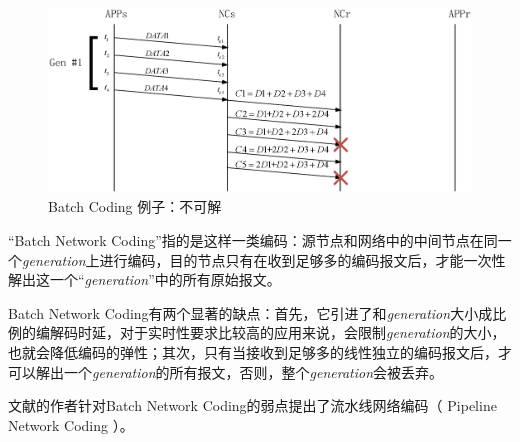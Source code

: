 \begin{figure}[htbp]
\centering
\includegraphics[width=6in]{figures/batchundecode.eps}
\caption{Batch Coding 例子：不可解}
\label{BATCHUNDECODE_EPS}
\end{figure}
\par
“Batch Network Coding”指的是这样一类编码：源节点和网络中的中间节点在同一个\emph{generation}上进行编码，目的节点只有在收到足够多的编码报文后，才能一次性解出这一个“\emph{generation}”中的所有原始报文。 
\par
Batch Network Coding有两个显著的缺点：首先，它引进了和\emph{generation}大小成比例的编解码时延，对于实时性要求比较高的应用来说，会限制\emph{generation}的大小，也就会降低编码的弹性；其次，只有当接收到足够多的线性独立的编码报文后，才可以解出一个\emph{generation}的所有报文，否则，整个\emph{generation}会被丢弃。
\par
文献\cite{chen2010pipeline}的作者针对Batch Network Coding的弱点提出了流水线网络编码（ Pipeline  Network Coding ）。
